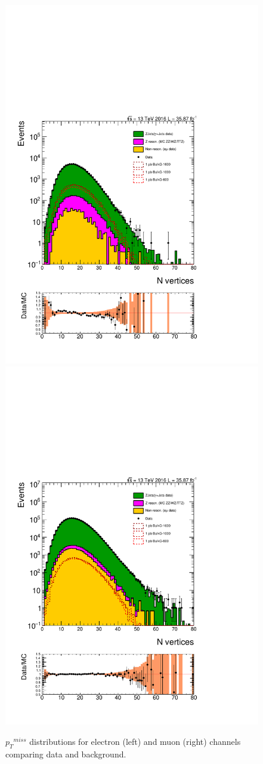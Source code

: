 \begin{figure}[htbp!]
\centering
\includegraphics[width=0.46\linewidth,page=18]{figures/ReMiniSummer16_DT_PhReMiniMCRcFixXsec_GMCPhPtWt_tightzpt50_puWeightsummer16_muoneg_gjet_metfilter_unblind_el_log_1pb.pdf}
\includegraphics[width=0.46\linewidth,page=18]{figures/ReMiniSummer16_DT_PhReMiniMCRcFixXsec_GMCPhPtWt_tightzpt50_puWeightsummer16_muoneg_gjet_metfilter_unblind_mu_log_1pb.pdf}
\caption{${p_{T}}^{miss}$ distributions for electron (left) and muon (right) channels
comparing data and background.}
\label{fig:gjet_met_narrow}
\end{figure}

